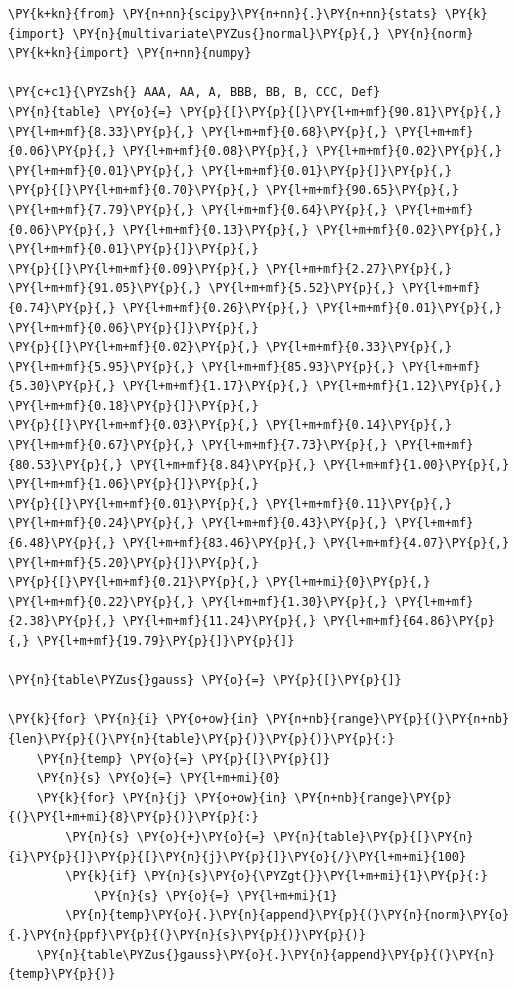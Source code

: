 \begin{tcolorbox}[breakable, size=fbox, boxrule=1pt, pad at break*=1mm,colback=cellbackground, colframe=cellborder]
\begin{Verbatim}[commandchars=\\\{\}]
\PY{k+kn}{from} \PY{n+nn}{scipy}\PY{n+nn}{.}\PY{n+nn}{stats} \PY{k}{import} \PY{n}{multivariate\PYZus{}normal}\PY{p}{,} \PY{n}{norm}
\PY{k+kn}{import} \PY{n+nn}{numpy}
		
\PY{c+c1}{\PYZsh{} AAA, AA, A, BBB, BB, B, CCC, Def}
\PY{n}{table} \PY{o}{=} \PY{p}{[}\PY{p}{[}\PY{l+m+mf}{90.81}\PY{p}{,} \PY{l+m+mf}{8.33}\PY{p}{,} \PY{l+m+mf}{0.68}\PY{p}{,} \PY{l+m+mf}{0.06}\PY{p}{,} \PY{l+m+mf}{0.08}\PY{p}{,} \PY{l+m+mf}{0.02}\PY{p}{,} \PY{l+m+mf}{0.01}\PY{p}{,} \PY{l+m+mf}{0.01}\PY{p}{]}\PY{p}{,}
\PY{p}{[}\PY{l+m+mf}{0.70}\PY{p}{,} \PY{l+m+mf}{90.65}\PY{p}{,} \PY{l+m+mf}{7.79}\PY{p}{,} \PY{l+m+mf}{0.64}\PY{p}{,} \PY{l+m+mf}{0.06}\PY{p}{,} \PY{l+m+mf}{0.13}\PY{p}{,} \PY{l+m+mf}{0.02}\PY{p}{,} \PY{l+m+mf}{0.01}\PY{p}{]}\PY{p}{,}
\PY{p}{[}\PY{l+m+mf}{0.09}\PY{p}{,} \PY{l+m+mf}{2.27}\PY{p}{,} \PY{l+m+mf}{91.05}\PY{p}{,} \PY{l+m+mf}{5.52}\PY{p}{,} \PY{l+m+mf}{0.74}\PY{p}{,} \PY{l+m+mf}{0.26}\PY{p}{,} \PY{l+m+mf}{0.01}\PY{p}{,} \PY{l+m+mf}{0.06}\PY{p}{]}\PY{p}{,}
\PY{p}{[}\PY{l+m+mf}{0.02}\PY{p}{,} \PY{l+m+mf}{0.33}\PY{p}{,} \PY{l+m+mf}{5.95}\PY{p}{,} \PY{l+m+mf}{85.93}\PY{p}{,} \PY{l+m+mf}{5.30}\PY{p}{,} \PY{l+m+mf}{1.17}\PY{p}{,} \PY{l+m+mf}{1.12}\PY{p}{,} \PY{l+m+mf}{0.18}\PY{p}{]}\PY{p}{,}
\PY{p}{[}\PY{l+m+mf}{0.03}\PY{p}{,} \PY{l+m+mf}{0.14}\PY{p}{,} \PY{l+m+mf}{0.67}\PY{p}{,} \PY{l+m+mf}{7.73}\PY{p}{,} \PY{l+m+mf}{80.53}\PY{p}{,} \PY{l+m+mf}{8.84}\PY{p}{,} \PY{l+m+mf}{1.00}\PY{p}{,} \PY{l+m+mf}{1.06}\PY{p}{]}\PY{p}{,}
\PY{p}{[}\PY{l+m+mf}{0.01}\PY{p}{,} \PY{l+m+mf}{0.11}\PY{p}{,} \PY{l+m+mf}{0.24}\PY{p}{,} \PY{l+m+mf}{0.43}\PY{p}{,} \PY{l+m+mf}{6.48}\PY{p}{,} \PY{l+m+mf}{83.46}\PY{p}{,} \PY{l+m+mf}{4.07}\PY{p}{,} \PY{l+m+mf}{5.20}\PY{p}{]}\PY{p}{,}
\PY{p}{[}\PY{l+m+mf}{0.21}\PY{p}{,} \PY{l+m+mi}{0}\PY{p}{,} \PY{l+m+mf}{0.22}\PY{p}{,} \PY{l+m+mf}{1.30}\PY{p}{,} \PY{l+m+mf}{2.38}\PY{p}{,} \PY{l+m+mf}{11.24}\PY{p}{,} \PY{l+m+mf}{64.86}\PY{p}{,} \PY{l+m+mf}{19.79}\PY{p}{]}\PY{p}{]}
		
\PY{n}{table\PYZus{}gauss} \PY{o}{=} \PY{p}{[}\PY{p}{]}
		
\PY{k}{for} \PY{n}{i} \PY{o+ow}{in} \PY{n+nb}{range}\PY{p}{(}\PY{n+nb}{len}\PY{p}{(}\PY{n}{table}\PY{p}{)}\PY{p}{)}\PY{p}{:}
    \PY{n}{temp} \PY{o}{=} \PY{p}{[}\PY{p}{]}
    \PY{n}{s} \PY{o}{=} \PY{l+m+mi}{0}
    \PY{k}{for} \PY{n}{j} \PY{o+ow}{in} \PY{n+nb}{range}\PY{p}{(}\PY{l+m+mi}{8}\PY{p}{)}\PY{p}{:}
        \PY{n}{s} \PY{o}{+}\PY{o}{=} \PY{n}{table}\PY{p}{[}\PY{n}{i}\PY{p}{]}\PY{p}{[}\PY{n}{j}\PY{p}{]}\PY{o}{/}\PY{l+m+mi}{100}
        \PY{k}{if} \PY{n}{s}\PY{o}{\PYZgt{}}\PY{l+m+mi}{1}\PY{p}{:}
            \PY{n}{s} \PY{o}{=} \PY{l+m+mi}{1}
        \PY{n}{temp}\PY{o}{.}\PY{n}{append}\PY{p}{(}\PY{n}{norm}\PY{o}{.}\PY{n}{ppf}\PY{p}{(}\PY{n}{s}\PY{p}{)}\PY{p}{)}
    \PY{n}{table\PYZus{}gauss}\PY{o}{.}\PY{n}{append}\PY{p}{(}\PY{n}{temp}\PY{p}{)}
		

\end{Verbatim}
\end{tcolorbox}
